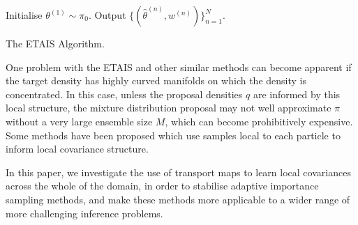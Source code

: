 \documentclass[final]{siamltex}
\begin{document}
\begin{table}[!h]
\centering
\begin{algorithm}[H]
\DontPrintSemicolon
\BlankLine
	Initialise $\theta^{(1)} \sim \pi_0$.\;
	Output $\{(\hat{\theta}^{(n)},w^{(n)})\}_{n=1}^N$.
\caption{The ETAIS Algorithm.\label{alg:ETAIS}}
\end{algorithm}
\end{table}

One problem with the ETAIS and other similar methods can become apparent if
the target density has highly curved manifolds on which the density is
concentrated. In this
case, unless the proposal densities $q$ are informed by this local
structure, the mixture distribution proposal may not well approximate
$\pi$ without a very large ensemble size $M$, which can become
prohibitively expensive. Some methods have been
proposed\cite{douc2007minimum}
which use samples local to each particle to inform local covariance
structure.

In this paper, we investigate the use of transport maps to learn local
covariances across the whole of the domain, in order to stabilise
adaptive importance sampling methods, and make these methods more applicable to a wider
range of more challenging inference problems.
\end{document}
